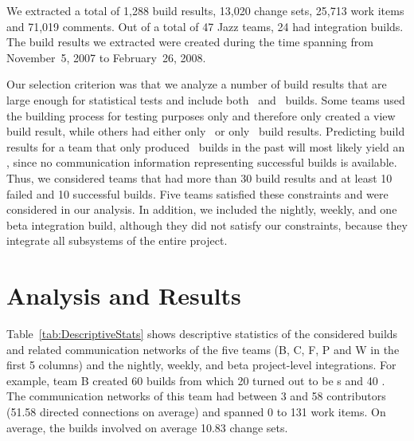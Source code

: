 We extracted a total of 1,288 build results, 13,020 change sets, 25,713 work items
and 71,019 comments. Out of a total of 47 Jazz teams, 24 had integration builds.
The build results we extracted were created during the time spanning from
November~5, 2007 to February~26, 2008.

Our selection criterion was that we analyze a number of build results
that are large enough for statistical tests and include both \ok\ and \error\
builds. Some teams used the building process for testing purposes only and therefore only created
a view build result, while others had either only \ok\ or only \error\
build results. Predicting build results for a team that only produced \error\
builds in the past will most likely yield an \error, since no communication
information representing successful builds is available. Thus, we considered
teams that had more than 30 build results and at least 10 failed and 10
successful builds. Five teams satisfied these constraints and were considered in
our analysis. In addition, we included the nightly, weekly, and one beta
integration build, although they did not satisfy our constraints, because 
they integrate all subsystems of the entire project.






\section{Analysis and Results}
\label{sec:AnalysisResults}
Table~\ref{tab:DescriptiveStats} shows descriptive statistics of the considered
builds and related communication networks of the five teams (B, C, F, P and W in
the first 5 columns) and the nightly, weekly, and beta project-level
integrations. For example, team B created 60 builds from which 20 turned out to
be \error s and 40 \ok. The communication networks of this team had between 3 and
58 contributors (51.58 directed connections on average) and spanned 0 to 131 work
items. On average, the builds involved on average 10.83 change sets.

